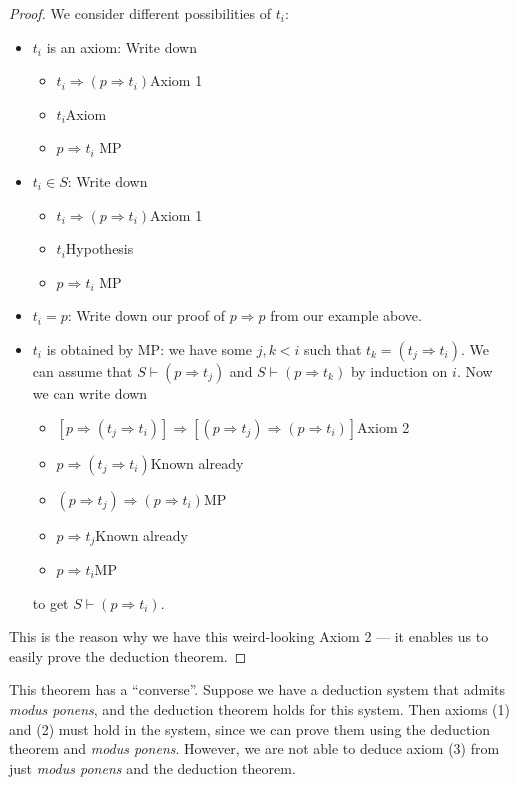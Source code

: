 \documentclass[a4paper]{article}
\begin{document}
\begin{proof}
  We consider different possibilities of $t_i$:
  \begin{itemize}
    \item $t_i$ is an axiom: Write down
      \begin{itemize}
        \item $t_i\Rightarrow (p\Rightarrow t_i)$\hfill Axiom 1
        \item $t_i$\hfill Axiom
        \item $p\Rightarrow t_i$ \hfill MP
      \end{itemize}
    \item $t_i\in S$: Write down
      \begin{itemize}
        \item $t_i\Rightarrow (p\Rightarrow t_i)$\hfill Axiom 1
        \item $t_i$\hfill Hypothesis
        \item $p\Rightarrow t_i$ \hfill MP
      \end{itemize}
    \item $t_i = p$: Write down our proof of $p\Rightarrow p$ from our example above.
    \item $t_i$ is obtained by MP: we have some $j, k< i$ such that $t_k = (t_j\Rightarrow t_i)$. We can assume that $S\vdash (p\Rightarrow t_j)$ and $S\vdash (p\Rightarrow t_k)$ by induction on $i$. Now we can write down
      \begin{itemize}
        \item $[p\Rightarrow (t_j\Rightarrow t_i)]\Rightarrow [(p\Rightarrow t_j)\Rightarrow (p\Rightarrow t_i)]$\hfill Axiom 2
        \item $p\Rightarrow (t_j\Rightarrow t_i)$\hfill Known already
        \item $(p\Rightarrow t_j)\Rightarrow (p\Rightarrow t_i)$\hfill MP
        \item $p\Rightarrow t_j$\hfill Known already
        \item $p\Rightarrow t_i$\hfill MP
      \end{itemize}
      to get $S\vdash (p\Rightarrow t_i)$.
  \end{itemize}
  This is the reason why we have this weird-looking Axiom 2 --- it enables us to easily prove the deduction theorem.
\end{proof}

This theorem has a ``converse''. Suppose we have a deduction system that admits \emph{modus ponens}, and the deduction theorem holds for this system. Then axioms (1) and (2) must hold in the system, since we can prove them using the deduction theorem and \emph{modus ponens}. However, we are not able to deduce axiom (3) from just \emph{modus ponens} and the deduction theorem.
\end{document}
